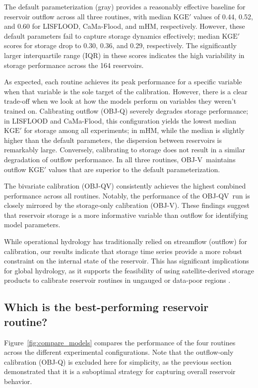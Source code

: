 \documentclass[hess, manuscript]{copernicus}
\newcommand{\calV}{OBJ-V}
\newcommand{\calQ}{OBJ-Q}
\newcommand{\calQV}{OBJ-QV}
\begin{document}
The default parameterization (gray) provides a reasonably effective baseline for reservoir outflow across all three routines, with median $\text{KGE}'$ values of 0.44, 0.52, and 0.60 for LISFLOOD, CaMa-Flood, and mHM, respectively. However, these default parameters fail to capture storage dynamics effectively; median $\text{KGE}'$ scores for storage drop to 0.30, 0.36, and 0.29, respectively. The significantly larger interquartile range (IQR) in these scores indicates the high variability in storage performance across the 164 reservoirs. 

As expected, each routine achieves its peak performance for a specific variable when that variable is the sole target of the calibration. However, there is a clear trade-off when we look at how the models perform on variables they weren't trained on. Calibrating outflow (\calQ) severely degrades storage performance; in LISFLOOD and CaMa-Flood, this configuration yields the lowest median $\text{KGE}'$ for storage among all experiments; in mHM, while the median is slightly higher than the default parameters, the dispersion between reservoirs is remarkably large. Conversely, calibrating to storage does not result in a similar degradation of outflow performance. In all three routines, \calV\ maintains outflow $\text{KGE}'$ values that are superior to the default parameterization.

The bivariate calibration (\calQV) consistently achieves the highest combined performance across all routines. Notably, the performance of the \calQV\ run is closely mirrored by the storage-only calibration (\calV). These findings suggest that reservoir storage is a more informative variable than outflow for identifying model parameters.

While operational hydrology has traditionally relied on streamflow (outflow) for calibration, our results indicate that storage time series provide a more robust constraint on the internal state of the reservoir. This has significant implications for global hydrology, as it supports the feasibility of using satellite-derived storage products to calibrate reservoir routines in ungauged or data-poor regions \citep{Shen2025}.

\subsection{Which is the best-performing reservoir routine?}
\label{sec:compare_models}

Figure~\ref{fig:compare_models} compares the performance of the four routines across the different experimental configurations. Note that the outflow-only calibration (\calQ) is excluded here for simplicity, as the previous section demonstrated that it is a suboptimal strategy for capturing overall reservoir behavior.
\end{document}
